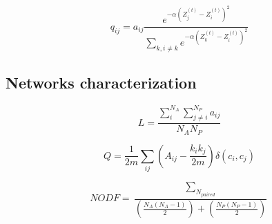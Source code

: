 \documentclass[a4paper, 12pt]{article}
\begin{document}
\begin{equation} \label{supeq:6}
  q_{ij} = a_{ij} \frac{e^{-\alpha(Z^{(t)}_{j} - Z^{(t)}_{i})^2}}{\sum_{k, i \neq k} e^{-\alpha(Z^{(t)}_{k} - Z^{(t)}_{i})^2} }
\end{equation}

\subsection*{Networks characterization}

\begin{equation} \label{supeq:7}
  L = \frac{\sum_{i}^{N_{A}}\sum_{j \neq i}^{N_{P}}a_{ij}}{N_{A}N_{P}}
\end{equation}

\begin{equation} \label{supeq:8}
  Q = \frac{1}{2m} \sum_{ij}(A_{ij} - \frac{k_{i}k_{j}}{2m}) \delta(c_{i}, c_{j})
\end{equation}

\begin{equation} \label{supeq:9}
  NODF = \frac{\sum_{N_{paired}}}{(\frac{N_{A}(N_{A} - 1)}{2}) + (\frac{N_{P}(N_{P} - 1)}{2})}
\end{equation}
\end{document}
